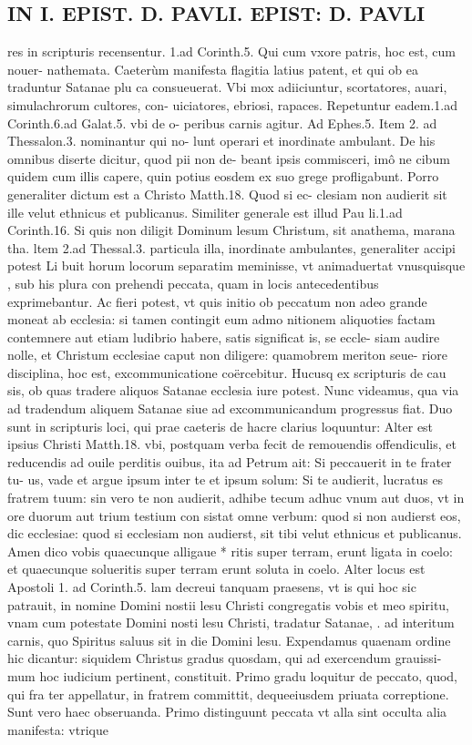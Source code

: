 \documentclass{article}
\begin{document}
\begin{pages}
\section*{IN I. EPIST. D. PAVLI. EPIST: D. PAVLI }
\marginpar{[ p.64 ]}\pstart res in scripturis recensentur. 1.ad Corinth.5. Qui cum vxore patris, hoc est, cum nouer- nathemata. Caeterùm manifesta flagitia latius patent, et qui ob ea traduntur Satanae plu ca consueuerat. Vbi mox adiiciuntur, scortatores, auari, simulachrorum cultores, con- uiciatores, ebriosi, rapaces. Repetuntur eadem.1.ad Corinth.6.ad Galat.5. vbi de o- peribus carnis agitur. Ad Ephes.5. Item 2. ad Thessalon.3. nominantur qui no- lunt operari et inordinate ambulant. De his omnibus diserte dicitur, quod pii non de- beant ipsis commisceri, imô ne cibum quidem cum illis capere, quin potius eosdem ex suo grege profligabunt. Porro generaliter dictum est a Christo Matth.18. Quod si ec- clesiam non audierit sit ille velut ethnicus et publicanus. Similiter generale est illud Pau li.1.ad Corinth.16. Si quis non diligit Dominum lesum Christum, sit anathema, marana tha. ltem 2.ad Thessal.3. particula illa, inordinate ambulantes, generaliter accipi potest Li buit horum locorum separatim meminisse, vt animaduertat vnusquisque , sub his plura con prehendi peccata, quam in locis antecedentibus exprimebantur. Ac fieri potest, vt quis initio ob peccatum non adeo grande moneat ab ecclesia: si tamen contingit eum admo nitionem aliquoties factam contemnere aut etiam ludibrio habere, satis significat is, se eccle- siam audire nolle, et Christum ecclesiae caput non diligere: quamobrem meriton seue- riore disciplina, hoc est, excommunicatione coërcebitur. Hucusq ex scripturis de cau sis, ob quas tradere aliquos Satanae ecclesia iure potest.  \pend\pstart Nunc videamus, qua via ad tradendum aliquem Satanae siue ad excommunicandum progressus fiat. Duo sunt in scripturis loci, qui prae caeteris de hacre clarius loquuntur: Alter est ipsius Christi Matth.18. vbi, postquam verba fecit de remouendis offendiculis, et reducendis ad ouile perditis ouibus, ita ad Petrum ait: Si peccauerit in te frater tu- us, vade et argue ipsum inter te et ipsum solum: Si te audierit, lucratus es fratrem tuum: sin vero te non audierit, adhibe tecum adhuc vnum aut duos, vt in ore duorum aut trium testium con sistat omne verbum: quod si non audierst eos, dic ecclesiae: quod si ecclesiam non   audierst, sit tibi velut ethnicus et publicanus. Amen dico vobis quaecunque alligaue * ritis super terram, erunt ligata in coelo: et quaecunque solueritis super terram erunt soluta in coelo. Alter locus est Apostoli 1. ad Corinth.5. lam decreui tanquam   praesens, vt is qui hoc sic patrauit, in nomine Domini nostii lesu Christi congregatis   vobis et meo spiritu, vnam cum potestate Domini nosti lesu Christi, tradatur Satanae, .  ad interitum carnis, quo Spiritus saluus sit in die Domini lesu. Expendamus quaenam ordine hic dicantur: siquidem Christus gradus quosdam, qui ad exercendum grauissi- mum hoc iudicium pertinent, constituit. Primo gradu loquitur de peccato, quod, qui fra ter appellatur, in fratrem committit, dequeeiusdem priuata correptione. Sunt vero haec obseruanda. Primo distinguunt peccata vt alla sint occulta alia manifesta: vtrique  
\end{pages}
\end{document}
